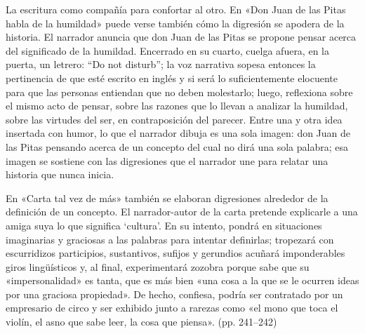 \documentclass[14pt,twoside,final]{extbook} %
\begin{document}
La escritura como compañía para confortar al otro. En «Don Juan de las Pitas habla de la humildad» puede verse también cómo la digresión se apodera de la historia. El narrador anuncia que don Juan de las Pitas se propone pensar acerca del significado de la humildad. Encerrado en su cuarto, cuelga afuera, en la puerta, un letrero: ``Do not disturb''; la voz narrativa sopesa entonces la pertinencia de que esté escrito en inglés y si será lo suficientemente elocuente para que las personas entiendan que no deben molestarlo; luego, reflexiona sobre el mismo acto de pensar, sobre las razones que lo llevan a analizar la humildad, sobre las virtudes del ser, en contraposición del parecer. Entre una y otra idea insertada con humor, lo que el narrador dibuja es una sola imagen: don Juan de las Pitas pensando acerca de un concepto del cual no dirá una sola palabra; esa imagen se sostiene con las digresiones que el narrador une para relatar una historia que nunca inicia.

En «Carta tal vez de más» también se elaboran digresiones alrededor de la definición de un concepto. El narrador-autor de la carta pretende explicarle a una amiga suya lo que significa `cultura'. En su intento, pondrá en situaciones imaginarias y graciosas a las palabras para intentar definirlas; tropezará con escurridizos participios, sustantivos, sufijos y gerundios acuñará imponderables giros lingüísticos y, al final, experimentará zozobra porque sabe que su «impersonalidad» es tanta, que es más bien «una cosa a la que se le ocurren ideas por una graciosa propiedad». De hecho, confiesa, podría ser contratado por un empresario de circo y ser exhibido junto a rarezas como «el mono que toca el violín, el asno que sabe leer, la cosa que piensa». (pp. 241--242)
\end{document}
